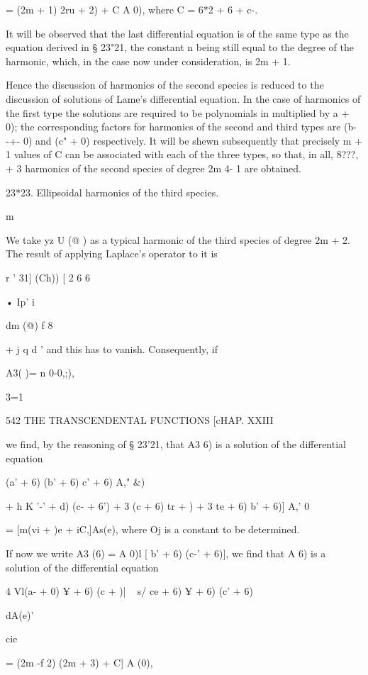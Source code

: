 {= (2m + 1) 2ru + 2) + C A 0), where C = 6*2 + 6 + c-.

It will be observed that the last differential equation is of the same
type as the equation derived in § 23"21, the constant n being still
equal to the degree of the harmonic, which, in the case now under
consideration, is 2m + 1.

Hence the discussion of harmonics of the second species is reduced to
the discussion of solutions of Lame's differential equation. In the
case of harmonics of the first type the solutions are required to be
polynomials in multiplied by \/ a + 0); the corresponding factors for
harmonics of the second and third types are \/(b- -+- 0) and (c" + 0)
respectively. It will be shewn subsequently that precisely m + 1
values of C can be associated with each of the three types, so that,
in all, 8???, + 3 harmonics of the second species of degree 2m 4- 1
are obtained.

23*23. Ellipsoidal harmonics of the third species.

m

We take yz U (@ ) as a typical harmonic of the third species of degree
2m + 2. The result of applying Laplace's operator to it is

r ' 31] (Ch)) [ 2 6 6

• Ip' i %

  dm (@) f 8 %

+ j q d%
' and this has to vanish. Consequently, if

A3( )= n 0-0,;),

3=1

542 THE TRANSCENDENTAL FUNCTIONS [cHAP. XXIII

we find, by the reasoning of § 23'21, that A3 6) is a solution of the
differential equation

(a' + 6) (b' + 6) c' + 6) A," \&)

+ h K '-' + d) (c- + 6') + 3 (c + 6) tr + ) + 3 te + 6) b' + 6)] A,' 0

= [m(vi + )e + iC,]As(e), where Oj is a constant to be determined.

If now we write A3 (6) = A 0)l [ b' + 6) (c-' + 6)], we find that A 6)
is a solution of the differential equation

4 Vl(a- + 0) ¥ + 6) (c + )| ~ s/ ce + 6) ¥ + 6) (c' + 6)

dA(e)'

cie

= (2m -f 2) (2m + 3) + C] A (0),

}

